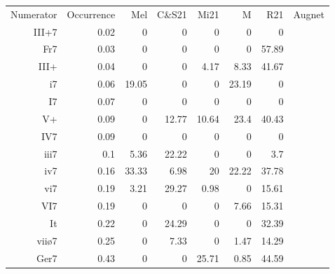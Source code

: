 \begin{tabular}{rrrrrrr}
Numerator & Occurrence & Mel     & C\&S21               & Mi21               & M&R21                       & Augnet               \\
III+7     & 0.02       & 0       & 0                  & 0                    & 0                           & 0                    \\
Fr7       & 0.03       & 0       & 0                  & 0                    & 0                           & 57.89                \\
III+      & 0.04       & 0       & 0                  & 4.17                 & 8.33                        & 41.67                \\
i7        & 0.06       & 19.05   & 0                  & 0                    & 23.19                       & 0                    \\
I7        & 0.07       & 0       & 0                  & 0                    & 0                           & 0                    \\
V+        & 0.09       & 0       & 12.77              & 10.64                & 23.4                        & 40.43                \\
IV7       & 0.09       & 0       & 0                  & 0                    & 0                           & 0                    \\
iii7      & 0.1        & 5.36    & 22.22              & 0                    & 0                           & 3.7                  \\
iv7       & 0.16       & 33.33   & 6.98               & 20                   & 22.22                       & 37.78                \\
vi7       & 0.19       & 3.21    & 29.27              & 0.98                 & 0                           & 15.61                \\
VI7       & 0.19       & 0       & 0                  & 0                    & 7.66                        & 15.31                \\
It        & 0.22       & 0       & 24.29              & 0                    & 0                           & 32.39                \\
viiø7     & 0.25       & 0       & 7.33               & 0                    & 1.47                        & 14.29                \\
Ger7      & 0.43       & 0       & 0                  & 25.71                & 0.85                        & 44.59                \\

\end{tabular}
